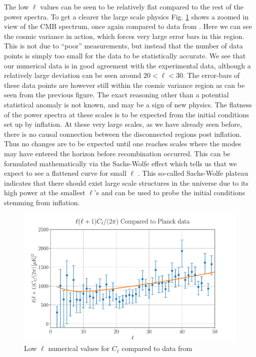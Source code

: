 \documentclass[%
reprint,
 amsmath,amssymb,
 aps,
]{revtex4-2}
\begin{document}
The low $\ell$ values can be seen to be relatively flat compared to the rest of the power spectra. To get a clearer the large scale physics Fig. \ref{fig:low_C_ell_vs_Planck} shows a zoomed in view of the CMB spectrum, once again compared to data from \cite{Planck:2018vyg}. Here we can see the cosmic variance in action, which forces very large error bars in this region. This is not due to ``poor'' measurements, but instead that the number of data points is simply too small for the data to be statistically accurate. We see that our numerical data is in good agreement with the experimental data, although a relatively large deviation can be seen around $20<\ell<30$. The error-bars of these data points are however still within the cosmic variance region as can be seen from the previous figure. The exact reasoning other than a potential statistical anomaly is not known, and may be a sign of new physics. The flatness of the power spectra at these scales is to be expected from the initial conditions set up by inflation. At these very large scales, as we have already seen before, there is no causal connection between the disconnected regions post inflation. Thus no changes are to be expected until one reaches scales where the modes may have entered the horizon before recombination occurred. This can be formulated mathematically via the Sachs-Wolfe effect which tells us that we expect to see a flattened curve for small $\ell$ \cite{Dodelson:2003ft}. This so-called Sachs-Wolfe plateau indicates that there should exist large scale structures in the universe due to its high power at the smallest $\ell$'s and can be used to probe the initial conditions stemming from inflation.
\begin{figure}[ht!]
	\includegraphics[width = \linewidth]{Figures/low_C_ell_vs_Planck.pdf}
	\caption{Low $\ell$ numerical values for $C_\ell$ compared to data from \cite{Planck:2018vyg}}
	\label{fig:low_C_ell_vs_Planck}
\end{figure}
\end{document}
